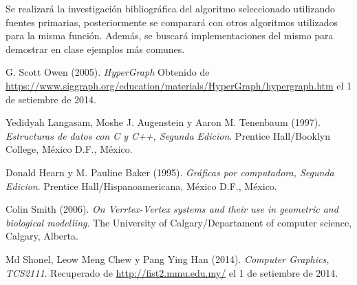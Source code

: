 \documentclass[letterpaper]{article}
\begin{document}
Se realizará la investigación bibliográfica del algoritmo seleccionado utilizando fuentes primarias, posteriormente se comparará con otros algoritmos utilizados para la misma función. Además, se buscará implementaciones del mismo para demostrar en clase ejemplos más comunes.\\


\renewcommand{\bibname}{Referencias}

\begin{thebibliography}{5}
 G. Scott Owen (2005). \textit{HyperGraph} Obtenido de \url{https://www.siggraph.org/education/materials/HyperGraph/hypergraph.htm}  el 1 de setiembre de 2014.

 Yedidyah Langasam, Moshe J. Augenstein y Aaron M. Tenenbaum (1997). \textit{Estructuras de datos con C y C++, Segunda Edicion}. Prentice Hall/Booklyn College, México D.F., México.

 Donald Hearn y M. Pauline Baker (1995). \textit{Gr\' aficas por computadora, Segunda Edicion}. Prentice Hall/Hispanoamericana, México D.F., México.

 Colin Smith (2006). \textit{On Verrtex-Vertex systems and their use in geometric and biological modelling}. The University of Calgary/Departament of computer science, Calgary, Alberta.

 Md Shonel, Leow Meng Chew y Pang Ying Han (2014). \textit{Computer Graphics, TCS2111}. Recuperado de \url{http://fist2.mmu.edu.my/} el 1 de setiembre de 2014.

\end{thebibliography} 
	
\end{document}
